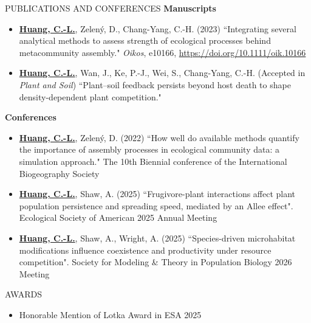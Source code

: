 \documentclass{resume} %
\begin{document}
	
	\begin{rSection}{PUBLICATIONS AND CONFERENCES}
		\textbf{Manuscripts}
		\begin{itemize}
			\item \underline{\textbf{Huang, C.-L.}}, Zelený, D., Chang-Yang, C.-H. (2023) ``Integrating several analytical methods to assess strength of ecological processes behind metacommunity assembly." \textit{Oikos}, e10166, \url{https://doi.org/10.1111/oik.10166}
			\item \underline{\textbf{Huang, C.-L.}}, Wan, J., Ke, P.-J., Wei, S., Chang-Yang, C.-H. (Accepted in \textit{Plant and Soil}) ``Plant–soil feedback persists beyond host death to shape density-dependent plant competition."
		\end{itemize}

	
		\textbf{Conferences}
		\begin{itemize}
			\item \underline{\textbf{Huang, C.-L.}}, Zelený, D. (2022) ``How well do available methods quantify the importance of assembly processes in ecological community data: a simulation approach." {\color{gray}The 10th Biennial conference of the International Biogeography Society}
			\item \underline{\textbf{Huang, C.-L.}}, Shaw, A. (2025) ``Frugivore-plant interactions affect plant population persistence and spreading speed, mediated by an Allee effect". {\color{gray} Ecological Society of American 2025 Annual Meeting}
			\item \underline{\textbf{Huang, C.-L.}}, Shaw, A., Wright, A. (2025) ``Species-driven microhabitat modifications influence coexistence and productivity under resource competition". {\color{gray} Society for Modeling \& Theory in Population Biology 2026 Meeting}
			
			
		\end{itemize}
	\end{rSection}


		\begin{rSection}{AWARDS}
		\begin{itemize}
			\item Honorable Mention of Lotka Award in ESA 2025
		\end{itemize}
	\end{rSection}
	
\end{document}

